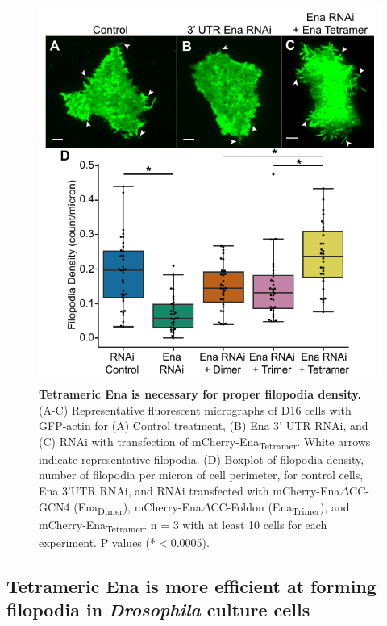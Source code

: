 \begin{figure}
\centering
\includegraphics[width=5in]{img/ch02/Figure_4_elife.pdf}
\caption[Tetrameric Ena is necessary for proper filopodia density.]{\textbf{Tetrameric Ena is necessary for proper filopodia density.} (A-C) Representative fluorescent micrographs of D16 cells with GFP-actin for (A) Control treatment, (B) Ena 3' UTR RNAi, and (C) RNAi with transfection of mCherry-Ena\textsubscript{Tetramer}. White arrows indicate representative filopodia. (D) Boxplot of filopodia density, number of filopodia per micron of cell perimeter, for control cells, Ena 3'UTR RNAi, and RNAi transfected with mCherry-Ena$\Delta$CC-GCN4 (Ena\textsubscript{Dimer}), mCherry-Ena$\Delta$CC-Foldon (Ena\textsubscript{Trimer}), and mCherry-Ena\textsubscript{Tetramer}. n = 3 with at least 10 cells for each experiment. P values (*$<$0.0005).}
\label{fig:ena-cells}
\end{figure}

\subsection{Tetrameric Ena is more efficient at forming filopodia in \textit{Drosophila} culture cells}\label{ena-fly-cells}

